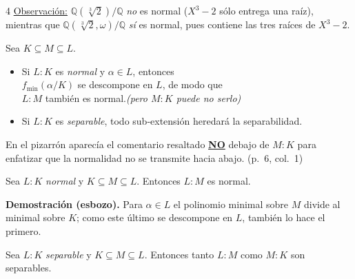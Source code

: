 \documentclass[landscape,a4paper]{article}
\begin{document}
\begin{multicols}{4}
\noindent\underline{Observación:}\;
$\mathbb{Q}(\sqrt[\,3]{2})/\mathbb{Q}$ \emph{no} es normal  
($X^{3}-2$ sólo entrega una raíz),  
mientras que $\mathbb{Q}(\sqrt[\,3]{2},\omega)/\mathbb{Q}$ \emph{sí} es normal, pues contiene las tres raíces de $X^{3}-2$.  
\begin{tcolorbox}[colback=white,colframe=brown!80!black,
                  colbacktitle=brown!80!black,coltitle=white,
                  title={Relaciones entre extensiones (p.~6, col.~1)}]
Sea $K\subseteq M\subseteq L$.
\begin{itemize}\itemsep2pt
  \item[$\star$] Si $L:K$ es \emph{normal} y $\alpha\in L$, entonces\\
        $f_{\min}(\alpha/K)$ se descompone en $L$, de modo que\\
        $L:M$ también es normal.\hfill\emph{(pero $M:K$ puede no serlo)}
  \item[$\star$] Si $L:K$ es \emph{separable}, todo sub‑extensión heredará la separabilidad.
\end{itemize}
\end{tcolorbox}

\noindent En el pizarrón aparecía el comentario resaltado  
\underline{\textbf{\Large NO}} debajo de $M:K$ para enfatizar que la normalidad no se transmite hacia abajo. \hfill(p.~6, col.~1)
\begin{tcolorbox}[colback=white,colframe=red!80!black,
                  colbacktitle=red!80!black,coltitle=white,
                  title={Proposición (p.~7, col.~2)}]
Sea $L:K$ \emph{normal} y $K\subseteq M\subseteq L$.  
Entonces $L:M$ es normal.
\end{tcolorbox}

\noindent\textbf{Demostración (esbozo).}  
Para $\alpha\in L$ el polinomio minimal sobre $M$ divide al minimal sobre $K$; como este último se descompone en $L$, también lo hace el primero.
\begin{tcolorbox}[colback=white,colframe=red!80!black,
                  colbacktitle=red!80!black,coltitle=white,
                  title={Proposición (p.~7, col.~3)}]
Sea $L:K$ \emph{separable} y $K\subseteq M\subseteq L$.  
Entonces tanto $L:M$ como $M:K$ son separables.
\end{tcolorbox}


\end{multicols}
\end{document}
